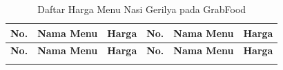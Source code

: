 
\begingroup
\scriptsize

\begin{xltabular}{\textwidth}{|C{0.5cm}|Y|R{1.35cm}|C{0.5cm}|Y|R{1.35cm}|}
\caption{Daftar Harga Menu Nasi Gerilya pada GrabFood}
\label{tab:survei_harga_nasi_gerilya_grabfood}\label{tab:daftar-harga-nasi-gerilya-grabfood} \\
\toprule

\textbf{No.} & \textbf{Nama Menu} & \textbf{Harga} & \textbf{No.} & \textbf{Nama Menu} & \textbf{Harga} \\ \hline
\midrule
\endfirsthead

\toprule

\textbf{No.} & \textbf{Nama Menu} & \textbf{Harga} & \textbf{No.} & \textbf{Nama Menu} & \textbf{Harga} \\ \hline
\midrule
\endhead

\endfoot

\bottomrule
\endlastfoot


\end{xltabular}
